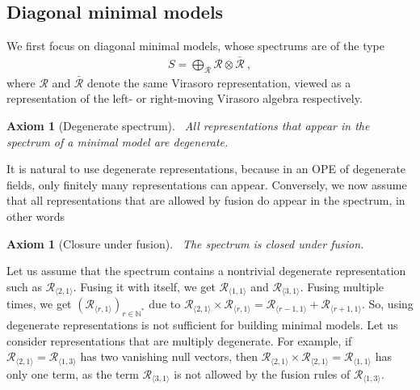 \documentclass[12pt, a4paper]{article}
\theoremstyle{break}
\newtheorem{hyp}[exo]{Axiom}
\begin{document}
\subsection{Diagonal minimal models}\label{sec:amm}

We first focus on diagonal minimal models, whose spectrums are of the type
\begin{align}
 S = \bigoplus_\mathcal{R} \mathcal{R}\otimes  \mathcal{\bar R}\ ,
\end{align}
where $\mathcal{R}$ and $ \mathcal{\bar R}$ denote the same Virasoro representation, viewed as a representation of the left- or right-moving Virasoro algebra respectively.

\begin{hyp}[Degenerate spectrum]
 ~\label{hyp:deg}
 All representations that appear in the spectrum of a minimal model are degenerate.
\end{hyp}
It is natural to use degenerate representations, because in an OPE of degenerate fields, only finitely many representations can appear. Conversely, we now assume that all representations that are allowed by fusion do appear in the spectrum, in other words

\begin{hyp}[Closure under fusion]
 ~\label{hyp:stab}
 The spectrum is closed under fusion. 
\end{hyp}

Let us assume that the spectrum contains a nontrivial degenerate representation such as $\mathcal{R}_{\langle 2,1\rangle}$. Fusing it with itself, we get $\mathcal{R}_{\langle 1, 1\rangle}$ and $\mathcal{R}_{\langle 3,1\rangle}$. Fusing multiple times, we get $(\mathcal{R}_{\langle r, 1\rangle})_{r\in\mathbb{N}^*}$ due to $\mathcal{R}_{\langle 2,1\rangle} \times \mathcal{R}_{\langle r,1\rangle} = \mathcal{R}_{\langle r-1,1\rangle}  + \mathcal{R}_{\langle r+1,1\rangle}$. 
So, using degenerate representations is not sufficient for building minimal models. Let us consider representations that are multiply degenerate. For example, if $\mathcal{R}_{\langle 2, 1\rangle} = \mathcal{R}_{\langle 1, 3\rangle}$ has two vanishing null vectors, then $\mathcal{R}_{\langle 2, 1\rangle} \times \mathcal{R}_{\langle 2, 1\rangle} = \mathcal{R}_{\langle 1,1\rangle}$ has only one term, as the term $\mathcal{R}_{\langle 3, 1\rangle}$ is not allowed by the fusion rules of $\mathcal{R}_{\langle 1, 3\rangle}$.
\end{document}
